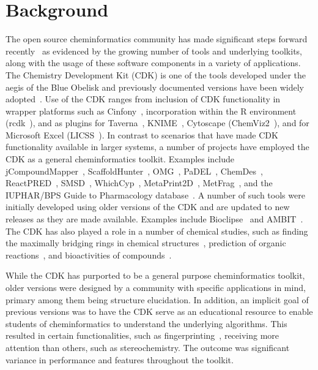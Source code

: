 \documentclass[10pt]{bmcart}
\begin{document}
\section*{Background}

The open source cheminformatics community has made significant steps
forward recently~\cite{OBoyle2011b} as evidenced by the growing number
of tools and underlying toolkits, along with the usage of these
software components in a variety of applications.
The Chemistry Development Kit (CDK) is one of the tools developed
under the aegis of the Blue Obelisk 
and previously documented versions have been widely adopted~\cite{Steinbeck2003,Steinbeck2006}.
Use of the CDK ranges from inclusion of CDK functionality in
wrapper platforms such as Cinfony~\cite{OBoyle2008}, incorporation
within the R environment (rcdk~\cite{Guha2007}), and as plugins for
Taverna~\cite{Truszkowski2011}, 
KNIME~\cite{Beisken2013}, Cytoscape (ChemViz2~\cite{ChemViz2}), and for
Microsoft Excel (LICSS~\cite{Lawson2012}).
In contrast to scenarios that have made CDK functionality available in
larger systems, a number of projects have employed the CDK as a
general cheminformatics toolkit. Examples include 
jCompoundMapper~\cite{Hinselmann2011}, ScaffoldHunter~\cite{wetzel2009interactive,Klein2013}, OMG~\cite{Peironcely2012},
PaDEL~\cite{yap2011padel}, ChemDes~\cite{Dong2015},
ReactPRED~\cite{ReactPRED}, SMSD~\cite{Rahman2009,Rahman2014,Rahman2016},
WhichCyp~\cite{Rostkowski2013}, MetaPrint2D~\cite{Carlsson2010}, MetFrag~\cite{Wolf2010},
and the IUPHAR/BPS Guide to Pharmacology database~\cite{Southan2016}.
A number of such tools were initially developed using older versions
of the CDK and are updated to new releases as they are made
available. Examples include Bioclipse~\cite{spjuth2007bioclipse,
spjuth2009bioclipse} and
AMBIT~\cite{jeliazkova2011ambit,jeliazkova2011ambitsmarts,kochev2013ambit}. The
CDK has also played a role in a number of chemical studies, such as finding
the maximally bridging rings in chemical structures~\cite{Marth2015},
prediction of organic reactions~\cite{Segler2016}, and bioactivities
of compounds~\cite{Alvarsson2016}.

While the CDK has purported to be a general purpose cheminformatics
toolkit, older versions were designed by a community with specific
applications in mind, primary among them being structure elucidation. In
addition, an implicit goal of previous versions was to have the CDK
serve as an educational resource to enable students of cheminformatics
to understand the underlying algorithms. This resulted in certain
functionalities, such as fingerprinting~\cite{Clark2014,Cannon2006},
receiving more attention than others, such as stereochemistry. The
outcome was significant variance in performance and features
throughout the toolkit.
\end{document}

